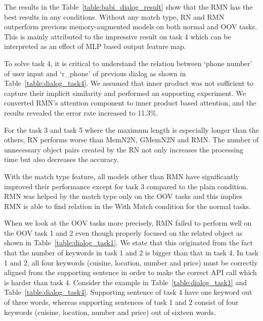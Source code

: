 \documentclass{article} \usepackage{iclr2018_conference,times}
\begin{document}
The results in the Table~\ref{table:babi_dialog_result} show that the RMN has the best results in any conditions.
Without any match type, RN and RMN outperform previous memory-augmented models on both normal and OOV tasks.
This is mainly attributed to the impressive result on task 4 which can be interpreted as an effect of MLP based output feature map.  

To solve task 4, it is critical to understand the relation between `phone number' of user input and `r\_phone' of previous dialog as shown in Table~\ref{table:dialog_task4}.
We assumed that inner product was not sufficient to capture their implicit similarity and performed an supporting experiment.
We converted RMN's attention component to inner product based attention, and the results revealed the error rate increased to 11.3\%.

For the task 3 and task 5 where the maximum length is especially longer than the others, RN performs worse than MemN2N, GMemN2N and RMN.
The number of unnecessary object pairs created by the RN not only increases the processing time but also decreases the accuracy. 


With the match type feature, all models other than RMN have significantly improved their performance except for task 3 compared to the plain condition.
RMN was helped by the match type only on the OOV tasks and this implies RMN is able to find relation in the With Match condition for the normal tasks.

\addtocounter{footnote}{-1}
\addtocounter{footnote}{+1}

When we look at the OOV tasks more precisely, RMN failed to perform well on the OOV task 1 and 2 even though  properly focused on the related object as shown in Table~\ref{table:dialog_task1}.
We state that this originated from the fact that the number of keywords in task 1 and 2 is bigger than that in task 4.
In task 1 and 2, all four keywords (cuisine, location, number and price) must be correctly aligned from the supporting sentence in order to make the correct API call which is harder than task 4.
Consider the example in Table~\ref{table:dialog_task1} and Table~\ref{table:dialog_task4}.
Supporting sentence of task 4 have one keyword out of three words, whereas supporting sentences of task 1 and 2 consist of four keywords (cuisine, location, number and price) out of sixteen words. 
\end{document}
